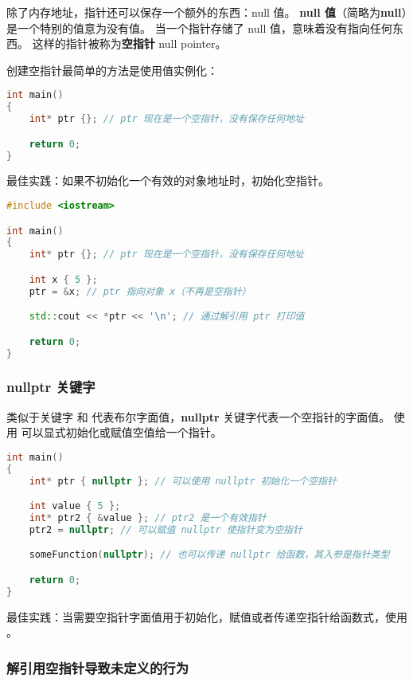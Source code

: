 \documentclass[../../LearnCpp.tex]{subfiles}
\begin{document}

除了内存地址，指针还可以保存一个额外的东西：null 值。
\textbf{null 值}（简略为\textbf{null}）是一个特别的值意为没有值。
当一个指针存储了 null 值，意味着没有指向任何东西。
这样的指针被称为\textbf{空指针} null pointer。

创建空指针最简单的方法是使用值实例化：

\begin{lstlisting}[language=C++]
int main()
{
    int* ptr {}; // ptr 现在是一个空指针，没有保存任何地址

    return 0;
}
\end{lstlisting}

最佳实践：如果不初始化一个有效的对象地址时，初始化空指针。

\begin{lstlisting}[language=C++]
#include <iostream>

int main()
{
    int* ptr {}; // ptr 现在是一个空指针，没有保存任何地址

    int x { 5 };
    ptr = &x; // ptr 指向对象 x（不再是空指针）

    std::cout << *ptr << '\n'; // 通过解引用 ptr 打印值

    return 0;
}
\end{lstlisting}

\subsubsection*{nullptr 关键字}

类似于关键字  和  代表布尔字面值，\textbf{nullptr} 关键字代表一个空指针的字面值。
使用  可以显式初始化或赋值空值给一个指针。

\begin{lstlisting}[language=C++]
int main()
{
    int* ptr { nullptr }; // 可以使用 nullptr 初始化一个空指针

    int value { 5 };
    int* ptr2 { &value }; // ptr2 是一个有效指针
    ptr2 = nullptr; // 可以赋值 nullptr 使指针变为空指针

    someFunction(nullptr); // 也可以传递 nullptr 给函数，其入参是指针类型

    return 0;
}
\end{lstlisting}

最佳实践：当需要空指针字面值用于初始化，赋值或者传递空指针给函数式，使用 。

\subsubsection*{解引用空指针导致未定义的行为}
\end{document}
